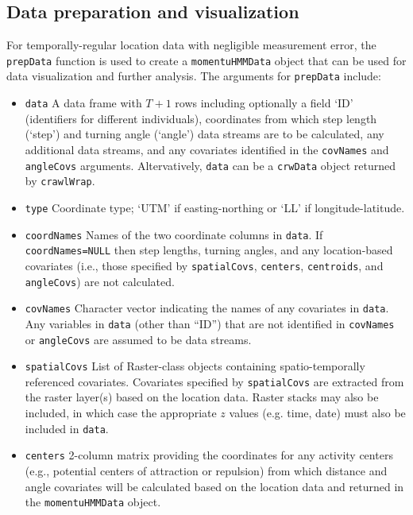 \documentclass[12pt]{article}\usepackage[]{graphicx}\usepackage[]{color}
\begin{document}

\subsection{Data preparation and visualization}
For temporally-regular location data with negligible measurement error, the \verb|prepData| function is used to create a \verb|momentuHMMData| object that can be used for data visualization and further analysis. The arguments for \verb|prepData| include:
\begin{itemize}
  \item{\verb|data|} A data frame with $T+1$ rows including optionally a field `ID' (identifiers for different individuals), coordinates from which step length (`step') and turning angle (`angle') data streams are to be calculated, any additional data streams, and any covariates identified in the \verb|covNames| and \verb|angleCovs| arguments. Altervatively, \verb|data| can be a \verb|crwData| object returned by \verb|crawlWrap|.
  \item{\verb|type|} Coordinate type; `UTM' if easting-northing or `LL' if longitude-latitude.
  \item{\verb|coordNames|} Names of the two coordinate columns in \verb|data|. If \verb|coordNames=NULL| then step lengths, turning angles, and any location-based covariates (i.e., those specified by \verb|spatialCovs|, \verb|centers|, \verb|centroids|, and \verb|angleCovs|) are not calculated.
  \item{\verb|covNames|} Character vector indicating the names of any covariates in \verb|data|. Any variables in \verb|data| (other than ``ID'') that are not identified in \verb|covNames| or \verb|angleCovs| are assumed to be data streams.
  \item{\verb|spatialCovs|} List of Raster-class objects \citep{Hijmans2016} containing spatio-temporally referenced covariates. Covariates specified by \verb|spatialCovs| are extracted from the raster layer(s) based on the location data. Raster stacks may also be included, in which case the appropriate $z$ values (e.g. time, date) must also be included in \verb|data|.
  \item{\verb|centers|} 2-column matrix providing the coordinates for any activity centers (e.g., potential centers of attraction or repulsion) from which distance and angle covariates will be calculated based on the location data and returned in the \verb|momentuHMMData| object.

\end{itemize}
\end{document}
